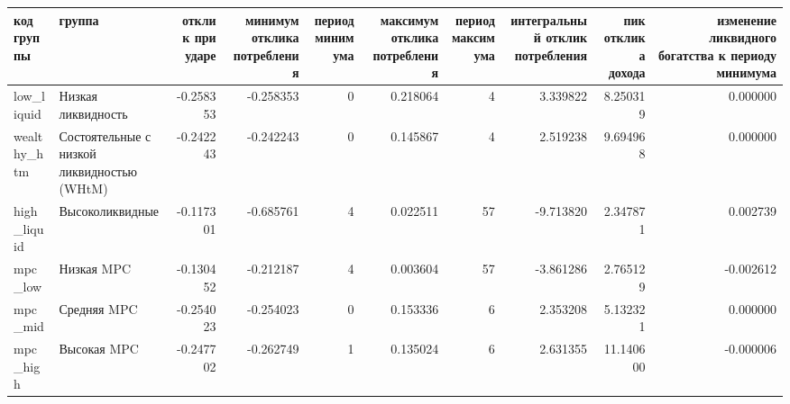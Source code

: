 \begin{tabular}{llrrrrrrrr}
\toprule
код группы & группа & отклик при ударе & минимум отклика потребления & период минимума & максимум отклика потребления & период максимума & интегральный отклик потребления & пик отклика дохода & изменение ликвидного богатства к периоду минимума \\
\midrule
low_liquid & Низкая ликвидность & -0.258353 & -0.258353 & 0 & 0.218064 & 4 & 3.339822 & 8.250319 & 0.000000 \\
wealthy_htm & Состоятельные с низкой ликвидностью (WHtM) & -0.242243 & -0.242243 & 0 & 0.145867 & 4 & 2.519238 & 9.694968 & 0.000000 \\
high_liquid & Высоколиквидные & -0.117301 & -0.685761 & 4 & 0.022511 & 57 & -9.713820 & 2.347871 & 0.002739 \\
mpc_low & Низкая MPC & -0.130452 & -0.212187 & 4 & 0.003604 & 57 & -3.861286 & 2.765129 & -0.002612 \\
mpc_mid & Средняя MPC & -0.254023 & -0.254023 & 0 & 0.153336 & 6 & 2.353208 & 5.132321 & 0.000000 \\
mpc_high & Высокая MPC & -0.247702 & -0.262749 & 1 & 0.135024 & 6 & 2.631355 & 11.140600 & -0.000006 \\
\bottomrule
\end{tabular}
